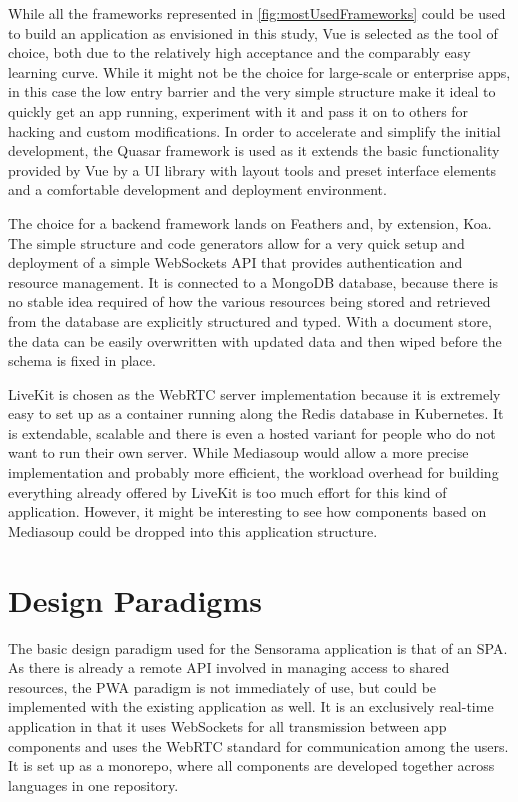 While all the frameworks represented in \autoref{fig:mostUsedFrameworks} could be used to build an application as envisioned in this study, Vue is selected as the tool of choice, both due to the relatively high acceptance and the comparably easy learning curve. While it might not be the choice for large-scale or enterprise apps, in this case the low entry barrier and the very simple structure make it ideal to quickly get an app running, experiment with it and pass it on to others for hacking and custom modifications. In order to accelerate and simplify the initial development, the Quasar framework is used as it extends the basic functionality provided by Vue by a \ac{UI} library with layout tools and preset interface elements and a comfortable development and deployment environment.

The choice for a backend framework lands on Feathers and, by extension, Koa. The simple structure and code generators allow for a very quick setup and deployment of a simple WebSockets \ac{API} that provides authentication and resource management. It is connected to a MongoDB database, because there is no stable idea required of how the various resources being stored and retrieved from the database are explicitly structured and typed. With a document store, the data can be easily overwritten with updated data and then wiped before the schema is fixed in place.

LiveKit is chosen as the WebRTC server implementation because it is extremely easy to set up as a container running along the Redis database in Kubernetes. It is extendable, scalable and there is even a hosted variant for people who do not want to run their own server. While Mediasoup would allow a more precise implementation and probably more efficient, the workload overhead for building everything already offered by LiveKit is too much effort for this kind of application. However, it might be interesting to see how components based on Mediasoup could be dropped into this application structure.

\section{Design Paradigms}

The basic design paradigm used for the Sensorama application is that of an \ac{SPA}. As there is already a remote API involved in managing access to shared resources, the \ac{PWA} paradigm is not immediately of use, but could be implemented with the existing application as well. It is an exclusively real-time application in that it uses WebSockets for all transmission between app components and uses the WebRTC standard for communication among the users. It is set up as a monorepo, where all components are developed together across languages in one repository.

